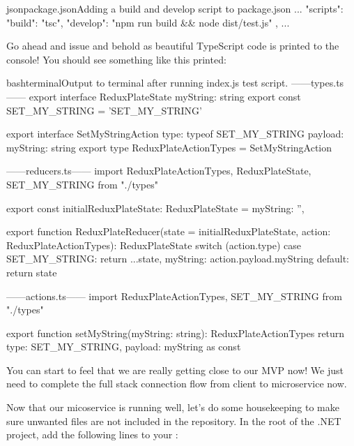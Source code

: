 \documentclass[paper=6in:9in,pagesize=pdftex,headinclude=on,footinclude=on,12pt,twoside]{scrbook}
\begin{document}
\begin{codeInput}{json}{package.json}{Adding a build and develop script to package.json}
...
"scripts": {
  "build": "tsc",
  "develop": "npm run build && node dist/test.js"
},
...
\end{codeInput}

Go ahead and issue  and behold as beautiful TypeScript code is printed to the console! You should see something like this printed:

\begin{codeInput}{bash}{terminal}{Output to terminal after running index.js test script.}
------types.ts------
export interface ReduxPlateState {
    myString: string
}
export const SET_MY_STRING = 'SET_MY_STRING'

export interface SetMyStringAction {
  type: typeof SET_MY_STRING
  payload: {
    myString: string
  }
}
export type ReduxPlateActionTypes = SetMyStringAction

------reducers.ts------
import { ReduxPlateActionTypes, ReduxPlateState, SET_MY_STRING } from "./types"

export const initialReduxPlateState: ReduxPlateState = {
  myString: '',
}

export function ReduxPlateReducer(state = initialReduxPlateState, action: ReduxPlateActionTypes): ReduxPlateState {
  switch (action.type) {
    case SET_MY_STRING:
      return {
        ...state,
        myString: action.payload.myString
      }
    default:
      return state
  }
}

------actions.ts------
import { ReduxPlateActionTypes, SET_MY_STRING } from "./types"

export function setMyString(myString: string): ReduxPlateActionTypes {
  return {
    type: SET_MY_STRING,
    payload: {
      myString
    }
  } as const
}
\end{codeInput}

You can start to feel that we are really getting close to our MVP now! \wink We just need to complete the full stack connection flow from client to microservice now.


Now that our micoservice is running well, let's do some housekeeping to make sure unwanted files are not included in the repository. In the root of the .NET project, add the following lines to your :
\end{document}
